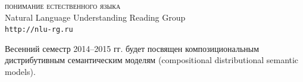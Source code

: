 \documentclass[12pt]{article}
\begin{document}

\parindent 0cm


\begin{center}
{\rm \Huge \textsc{понимание естественного языка}}\\
\bigskip
{\rm \Large Natural Language Understanding Reading Group}\\
\bigskip
{\rm \Large \texttt{http://nlu-rg.ru}}
\end{center}

\bigskip
\medskip


\begin{spacing}{1.15}
Весенний семестр 2014--2015 гг. будет посвящен композициональным дистрибутивным семантическим моделям (compositional distributional semantic models).
\end{spacing}

\medskip
\end{document}
